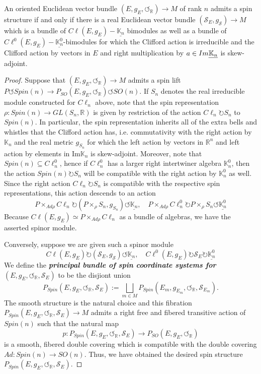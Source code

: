 \documentclass[10pt,a4paper]{amsart}
\def\Sc{\ensuremath{\mathscr{S}}}
\def\bK{\ensuremath{\mathbb{K}}}
\def\bR{\ensuremath{\mathbb{R}}}
\def\cal{\ensuremath{\boldsymbol{\circlearrowleft}}}
\begin{document}
\begin{theorem}
    An oriented Euclidean vector bundle $(E,g_E,\cal_{\bR})\rightarrow M$ of rank $n$ admits a spin structure if and only if there is a real Euclidean vector bundle $(\Sc_E,g_{\Sc})\rightarrow M$ which is a bundle of $C\ell(E,g_E)-\underline{\bK_n}$ bimodules as well as a bundle of $C\ell^0(E,g_E)-\underline{\bK^0_n}$-bimodules for which the Clifford action is irreducible and the Clifford action by vectors in $E$ and right multiplication by $a\in\emph{Im}\underline{\bK_n}$ is skew-adjoint.
\end{theorem}

\begin{proof}
    Suppose that $(E,g_E,\cal_{\bR})\rightarrow M$ admits a spin lift $P\circlearrowleft Spin(n)\rightarrow P_{SO}(E,g_E,\cal_{\bR})\circlearrowleft SO(n)$. If $S_n$ denotes the real irreducible module constructed for $C\ell_n$ above, note that the spin representation $\rho :Spin(n)\rightarrow GL(S_n,\bR)$ is given by restriction of the action $C\ell_n\circlearrowright S_n$ to $Spin(n)$. In particular, the spin representation inherits all of the extra bells and whistles that the Clifford action has, i.e. commutativity with the right action by $\bK_n$ and the real metric $g_{S_n}$ for which the left action by vectors in $\bR^n$ and left action by elements in $\text{Im}\bK_n$ is skew-adjoint. Moreover, note that $Spin(n)\subseteq C\ell^0_n$, hence if $C\ell^0_n$ has a larger right intertwiner algebra $\bK^0_n$, then the action $Spin(n)\circlearrowright S_n$ will be compatible with the right action by $\bK^0_n$ as well. Since the right action $C\ell_n\circlearrowright S_n$ is compatible with the respective spin representations, this action descends to an action
    \[
        P\times_{Ad\rho} C\ell_n\circlearrowright (P\times_{\rho}S_n,g_{S_n})\circlearrowleft \underline{\bK_n},\quad P\times_{Ad\rho}C\ell^0_n\circlearrowright P\times_{\rho}S_n\circlearrowleft \underline{\bK^0_n}
    \]
    Because $C\ell(E,g_E)\simeq P\times_{Ad\rho}C\ell_n$ as a bundle of algebras, we have the asserted spinor module.\par
    Conversely, suppose we are given such a spinor module 
    \[
        C\ell(E,g_E)\circlearrowright (\Sc_E,g_{\Sc})\circlearrowleft\underline{\bK_n},\quad C\ell^0(E,g_E)\circlearrowright \Sc_E\circlearrowright \underline{\bK^0_n}
    \]
    We define the \textbf{\emph{principal bundle of spin coordinate systems for $(E,g_E,\cal_{\bR},\Sc_E)$}} to be the disjiont union
    \[
    P_{Spin}(E,g_E,\cal_{\bR},\Sc_E):=\bigsqcup_{m\in M}P_{Spin}(E_m,g_{E_m},\cal_{\bR},\Sc_{E_m}).
    \]
    The smooth structure is the natural choice and this fibration $P_{Spin}(E,g_E,\cal_{\bR},\Sc_E)\rightarrow M$ admits a right free and fibered transitive action of $Spin(n)$ such that the natural map
    \[
        p:P_{Spin}(E,g_E,\cal_{\bR},\Sc_E)\rightarrow P_{SO}(E,g_E,\cal_{\bR})
    \]
    is a smooth, fibered double covering which is compatible with the double covering $Ad:Spin(n)\rightarrow SO(n)$. Thus, we have obtained the desired spin structure $P_{Spin}(E,g_E,\cal_{\bR},\Sc_E)$.
\end{proof}
\end{document}

